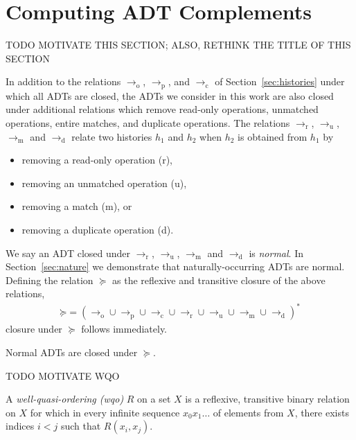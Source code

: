 \section{Computing ADT Complements}
\label{sec:patterns}

TODO MOTIVATE THIS SECTION; ALSO, RETHINK THE TITLE OF THIS SECTION

In addition to the relations $\to_\mathrm{o}$, $\to_\mathrm{p}$, and
$\to_\mathrm{c}$ of Section~\ref{sec:histories} under which all ADTs are
closed, the ADTs we consider in this work are also closed under additional
relations which remove read-only operations, unmatched operations, entire
matches, and duplicate operations. The relations $\to_\mathrm{r}$,
$\to_\mathrm{u}$, $\to_\mathrm{m}$ and $\to_\mathrm{d}$ relate two histories
$h_1$ and $h_2$ when $h_2$ is obtained from $h_1$ by
\begin{itemize}

  \item removing a read-only operation (r),

  \item removing an unmatched operation (u),

  \item removing a match (m), or

  \item removing a duplicate operation (d).

\end{itemize}
We say an ADT closed under $\to_\mathrm{r}$, $\to_\mathrm{u}$, $\to_\mathrm{m}$
and $\to_\mathrm{d}$ is \emph{normal}. In Section~\ref{sec:nature} we
demonstrate that naturally-occurring ADTs are normal. Defining the relation
$\succeq$ as the reflexive and transitive closure of the above relations,
\begin{align*}
  \mathord{\succeq} = (
    \to_\mathrm{o} \cup \to_\mathrm{p} \cup \to_\mathrm{c} \cup 
    \to_\mathrm{r} \cup \to_\mathrm{u} \cup \to_\mathrm{m} \cup \to_\mathrm{d}
  )^\ast
\end{align*}
closure under $\succeq$ follows immediately.

\begin{lemma}

  Normal ADTs are closed under $\succeq$.

\end{lemma}

TODO MOTIVATE WQO

A \emph{well-quasi-ordering (wqo)} $R$ on a set $X$ is a reflexive, transitive
binary relation on $X$ for which in every infinite sequence $x_0 x_1 \ldots$ of
elements from $X$, there exists indices $i < j$ such that $R(x_i,x_j)$.

